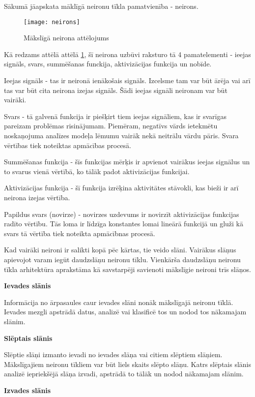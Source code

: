 Sākumā jāapskata māklīgā neironu tīkla pamatvienība - neirons.
\begin{figure}[H]
	\texttt{[image: neirons]}
	\caption{Mākslīgā neirona attēlojums}
	\label{fig:neirons}
\end{figure}

Kā redzams attēlā attēlā \ref{fig:neirons}, šī neirona uzbūvi raksturo tā 4 pamatelementi - ieejas signāls, svars, summēšanas funckija, aktivizācijas funkcija un nobīde.

Ieejas signāls - tas ir neironā ienākošais signāls. Izcelsme tam var būt ārēja vai arī tas var būt cita neirona izejas signāls. Šādi ieejas signāli neironam var būt vairāki.

Svars - tā galvenā funkcija ir piešķirt tiem ieejas signāliem, kas ir svarīgas pareizam problēmas risinājumam. Piemēram, negatīvs vārds ietekmētu noskaņojuma analīzes modeļa lēmumu vairāk nekā neitrālu vārdu pāris. Svara vērtības tiek noteiktas apmācības procesā.

Summēšanas funkcija - šīs funkcijas mērķis ir apvienot vairākus ieejas signālus un to svarus vienā vērtībā, ko tālāk padot aktivizācijas funkcijai.

Aktivizācijas funkcija - šī funkcija izrēķina aktivitātes stāvokli, kas bieži ir arī neirona izejas vērtība.	

Papildus svars (novirze) -  novirzes uzdevums ir novirzīt aktivizācijas funkcijas radīto vērtību. Tās loma ir līdzīga konstantes lomai lineārā funkcijā un gluži kā svars tā vērtība tiek noteikta apmācībnas procesā.

Kad vairāki neironi ir salikti kopā pēc kārtas, tie veido slāni. Vairākus slāņus apievojot varam iegūt daudzslāņu neironu tīklu. Vienkārša daudzslāņu neironu tīkla arhitektūra aprakstāma kā savstarpēji savienoti mākslīgie neironi trīs slāņos.

\textbf{Ievades slānis}

Informācija no ārpasaules caur ievades slāni nonāk mākslīgajā neironu tīklā. Ievades mezgli apstrādā datus, analizē vai klasificē tos un nodod tos nākamajam slānim.

\textbf{Slēptais slānis}

Slēptie slāņi izmanto ievadi no ievades slāņa vai citiem slēptiem slāņiem. Mākslīgajiem neironu tīkliem var būt liels skaits slēpto slāņu. Katrs slēptais slānis analizē iepriekšējā slāņa izvadi, apstrādā to tālāk un nodod nākamajam slānim.

\textbf{Izvades slānis}

